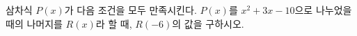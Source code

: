 삼차식 $P(x)$가 다음 조건을 모두 만족시킨다. \noindent $P(x)$를 $x^2+3x-10$으로 나누었을 때의 나머지를 $R(x)$라 할 때, $R(-6)$의 값을 구하시오.
